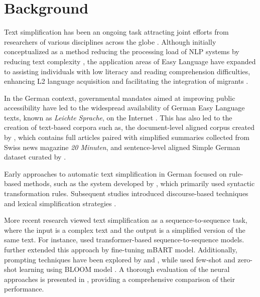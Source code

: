 \documentclass[11pt]{article}
\begin{document}
\section{Background}

Text simplification has been an ongoing task attracting joint efforts from researchers of various disciplines across the globe \citep{shardlow2014survey}. Although initially conceptualized as a method reducing the processing load of NLP systems by reducing text complexity \citep{chandrasekar1997automatic}, the application areas of Easy Language have expanded to assisting individuals with low literacy and reading comprehension difficulties, enhancing L2 language acquisition and facilitating the integration of migrants \citep{al2021automated,steinmetz-harbusch-2022-text,bock2014leichte}. 

In the German context, governmental mandates aimed at improving public accessibility have led to the widespread availability of German Easy Language texts, known as \textit{Leichte Sprache}, on the Internet \citep{ebling-2022-automatic,asghari-2023-prevalence}. This has also led to the creation of text-based corpora such as, the document-level aligned corpus created by \citet{gonzales-2021-new}, which contains full articles paired with simplified summaries collected from Swiss news magazine \textit{20 Minuten}, and sentence-level aligned Simple German dataset curated by \citet{toborek-2023-new}. 

Early approaches to automatic text simplification in German focused on rule-based methods, such as the system developed by \citet{suter-etal-2016-rule}, which primarily used syntactic transformation rules. Subsequent studies introduced discourse-based techniques \citep{niklaus-etal-2019-dissim} and lexical simplification strategies \citep{siegal2019}. 

More recent research viewed text simplification as a sequence-to-sequence task, where the input is a complex text and the output is a simplified version of the same text. For instance, \citet{sauberli-etal-2020-benchmarking,spring-etal-2021-exploring,ebling-2022-automatic} used transformer-based \citep{vaswani2017attention} sequence-to-sequence models. \citet{gonzales-2021-new} further extended this approach by fine-tuning mBART \citep{liu2020multilingual} model. Additionally, prompting techniques have been explored by \citet{ryan-etal-2023-revisiting} and \citet{alva2021}, while \citet{mallinson-etal-2020-zero} used few-shot and zero-shot learning using BLOOM model \citep{scao2023}. A thorough evaluation of the neural approaches is presented in \citet{stodden-2024-reproduction}, providing a comprehensive comparison of their performance.  
\end{document}
